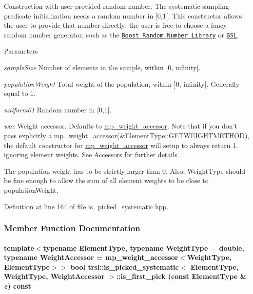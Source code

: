 Construction with user-\/provided random number. The systematic sampling predicate initialization needs a random number in {\ttfamily \mbox{[}0,1\mbox{[}}. This constructor allows the user to provide that number directly; the user is free to choose a fancy random number generator, such as the \href{http://www.boost.org/libs/random/index.html}{\tt Boost Random Number Library} or \href{http://www.gnu.org/software/gsl/manual/html_node/Random-Number-Generation.html}{\tt GSL}.


\begin{DoxyParams}{Parameters}
\item[{\em sampleSize}]Number of elements in the sample, within {\ttfamily \mbox{[}0, infinity\mbox{[}}.\item[{\em populationWeight}]Total weight of the population, within {\ttfamily \mbox{]}0, infinity\mbox{[}}. Generally equal to 1.\item[{\em uniform01}]Random number in {\ttfamily \mbox{[}0,1\mbox{[}}.\item[{\em wac}]Weight accessor. Defaults to \hyperlink{classtrsl_1_1mp__weight__accessor}{mp\_\-weight\_\-accessor}. Note that if you don't pass explicitly a \hyperlink{classtrsl_1_1mp__weight__accessor}{mp\_\-weight\_\-accessor}({\ttfamily \&ElementType::GETWEIGHTMETHOD}), the default constructor for \hyperlink{classtrsl_1_1mp__weight__accessor}{mp\_\-weight\_\-accessor} will setup to always return 1, ignoring element weights. See \hyperlink{group__accessor}{Accessors} for further details.\end{DoxyParams}
The population weight has to be strictly larger than 0. Also, {\ttfamily WeightType} should be fine enough to allow the sum of all element weights to be close to {\ttfamily populationWeight}. 

Definition at line 164 of file is\_\-picked\_\-systematic.hpp.

\subsubsection{Member Function Documentation}
\hypertarget{classtrsl_1_1is__picked__systematic_a47828e07ba7bc503b503e069e145d68a}{
\paragraph[{is\_\-first\_\-pick}]{\setlength{\rightskip}{0pt plus 5cm}template$<$typename ElementType, typename WeightType = double, typename WeightAccessor = mp\_\-weight\_\-accessor$<$WeightType, ElementType$>$$>$ bool {\bf trsl::is\_\-picked\_\-systematic}$<$ ElementType, WeightType, WeightAccessor $>$::is\_\-first\_\-pick (const ElementType \& {\em e}) const}\hfill}
\label{classtrsl_1_1is__picked__systematic_a47828e07ba7bc503b503e069e145d68a}


